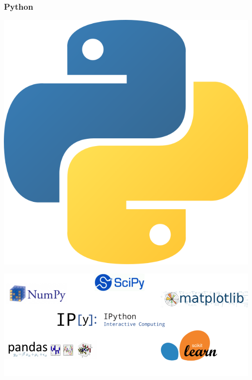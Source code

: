 \begin{frame}
    \frametitle{Python}
    \centering
    \includegraphics[scale=0.06]{Bin/python_logo.png}

    \vspace{1cm}
    \pause

    \includegraphics[scale=0.3]{Bin/python_libraries.png}

\end{frame}


